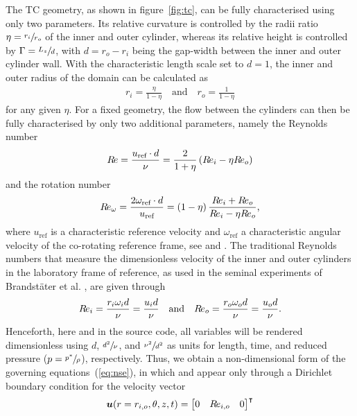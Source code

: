 \documentclass[a4paper, 11pt, DIV=11]{scrartcl}
\begin{document}
The TC geometry, as shown in figure~\ref{fig:tc}, can be fully characterised using
only two parameters. Its relative curvature is controlled by the radii ratio
$\eta=\sfrac{r_i}{r_o}$ of the inner and outer cylinder, whereas its relative height
is controlled by $\Gamma=\sfrac{L_z}{d}$, with $d=r_{o}-r_{i}$ being the gap-width
between the inner and outer cylinder wall. With the characteristic length scale set
to $d=1$, the inner and outer radius of the domain can be calculated as
\begin{align}
r_{i} = \frac{\eta}{1-\eta}
\quad\text{and}\quad
r_{o} = \frac{1}{1-\eta}
\end{align}
for any given $\eta$. For a fixed geometry, the flow between the cylinders can then
be fully characterised by only two additional parameters, namely the Reynolds number
\begin{align}
R\hspace{-0.1em}e = \frac{u_{\text{ref}}\cdot d}{\nu}
=\frac{2}{1+\eta}\left(R\hspace{-0.1em}e_{i}-\eta R\hspace{-0.1em}e_{o}\right)
\end{align}
and the rotation number
\begin{align}
R\hspace{-0.1em}e_{\omega} = \frac{2\omega_{\text{ref}}\cdot d}{u_{\text{ref}}} =
\left(1-\eta\right) \frac{R\hspace{-0.1em}e_{i}+R\hspace{-0.1em}e_{o}}{R\hspace{-0.1em}e_{i}-\eta R\hspace{-0.1em}e_{o}}
\text{,}
\end{align}
where $u_{\text{ref}}$ is a characteristic reference velocity and
$\omega_{\text{ref}}$ a characteristic angular velocity of the co-rotating reference
frame, see \eg \cite{Dubrulle2005a} and \cite{Brauckmann2016}. The traditional Reynolds
numbers that measure the dimensionless velocity of the inner and outer cylinders in the
laboratory frame of reference, as \eg used in the seminal experiments of Brandstäter
et al. \cite{Brandstater1983, Brandstater1987}, are given through
\begin{align}
R\hspace{-0.1em}e_{i} = \frac{r_{i}\omega_{i}d}{\nu} = \frac{u_{i}d}{\nu}
\hspace{1em}\text{and}\hspace{1em}
R\hspace{-0.1em}e_{o} = \frac{r_{o}\omega_{o}d}{\nu} = \frac{u_{o}d}{\nu}
\text{.}
\label{eq:reynoldsIO}
\end{align}
Henceforth, here and in the source code, all variables will be rendered dimensionless
using $d$, $\sfrac{d^2}{\nu}$, and $\sfrac{\nu^2}{d^2}$ as units for length, time,
and reduced pressure ($p=\sfrac{p^{\ast}}{\rho}$), respectively. Thus, we obtain a
non-dimensional form of the governing equations~(\ref{eq:nse}), in which \Rei and \Reo
appear only through a Dirichlet boundary condition for the velocity vector
\begin{align}
\boldsymbol{u}(r=r_{i,o}, \theta, z, t) =
\begin{bmatrix}
0 & R\hspace{-0.1em}e_{i,o} & 0
\end{bmatrix}^{\intercal}
\label{eq:noslipBC}
\end{align}
\end{document}
